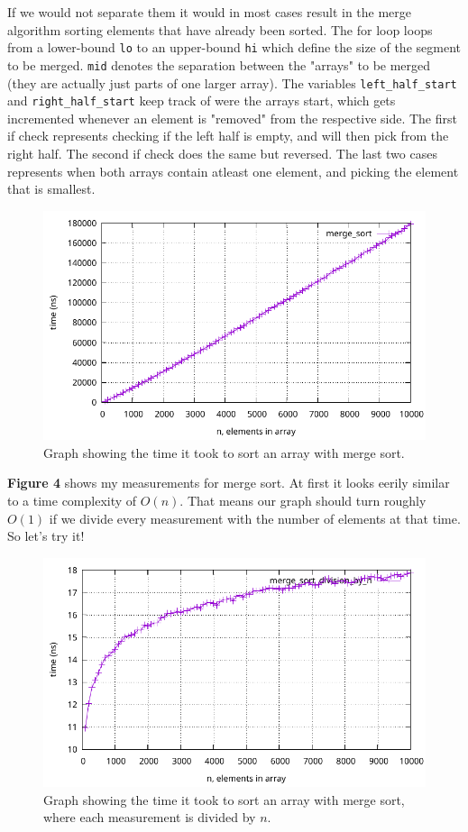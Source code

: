 \documentclass[a4paper, 11pt]{article}
\begin{document}
	If we would not separate them it would in most cases result in the merge algorithm sorting elements that have already been sorted.
	The for loop loops from a lower-bound \texttt{lo} to an upper-bound \texttt{hi} which define the size of the segment to be merged.
	\texttt{mid} denotes the separation between the "arrays" to be merged (they are actually just parts of one larger array).
	The variables \texttt{left\_half\_start} and \texttt{right\_half\_start} keep track of were the arrays start,
	which gets incremented whenever an element is "removed" from the respective side.
	The first if check represents checking if the left half is empty, and will then pick from the right half.
	The second if check does the same but reversed.
	The last two cases represents when both arrays contain atleast one element, and picking the element that is smallest.
	\begin{figure}[H]
		\centering
		\includegraphics[scale=0.7]{graphs/merge_sort.pdf}
		\caption{
			Graph showing the time it took to sort an array with merge sort.
		}
	\end{figure}
	\textbf{Figure 4} shows my measurements for merge sort.
	At first it looks eerily similar to a time complexity of \(O(n)\).
	That means our graph should turn roughly \(O(1)\) if we divide every measurement with the number of elements at that time. So let's try it!
	\begin{figure}[H]
		\centering
		\includegraphics[scale=0.7]{graphs/merge_sort_division_by_n.pdf}
		\caption{
			Graph showing the time it took to sort an array with merge sort, where each measurement is divided by \(n\).
		}
	\end{figure}
\end{document}
